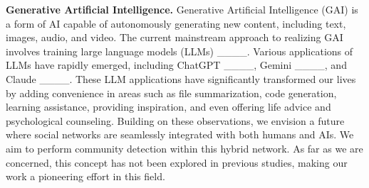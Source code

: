 \noindent\textbf{Generative Artificial Intelligence.} Generative Artificial Intelligence (GAI) is a form of AI capable of autonomously generating new content, including text, images, audio, and video. The current mainstream approach to realizing GAI involves training large language models (LLMs) ____. Various applications of LLMs have rapidly emerged, including ChatGPT ____, Gemini ____, and Claude ____. These LLM applications have significantly transformed our lives by adding convenience in areas such as file summarization, code generation, learning assistance, providing inspiration, and even offering life advice and psychological counseling. Building on these observations, we envision a future where social networks are seamlessly integrated with both humans and AIs. We aim to perform community detection within this hybrid network. As far as we are concerned, this concept has not been explored in previous studies, making our work a pioneering effort in this field.